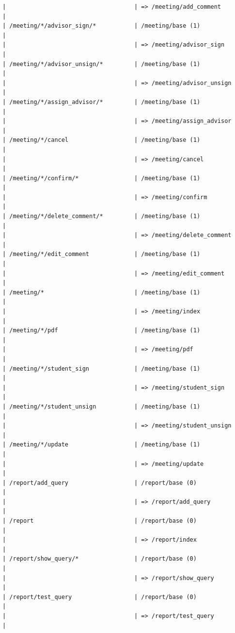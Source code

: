 \documentclass{journal}
\begin{document}
\begin{verbatim}
|                                     | => /meeting/add_comment              |
| /meeting/*/advisor_sign/*           | /meeting/base (1)                    |
|                                     | => /meeting/advisor_sign             |
| /meeting/*/advisor_unsign/*         | /meeting/base (1)                    |
|                                     | => /meeting/advisor_unsign           |
| /meeting/*/assign_advisor/*         | /meeting/base (1)                    |
|                                     | => /meeting/assign_advisor           |
| /meeting/*/cancel                   | /meeting/base (1)                    |
|                                     | => /meeting/cancel                   |
| /meeting/*/confirm/*                | /meeting/base (1)                    |
|                                     | => /meeting/confirm                  |
| /meeting/*/delete_comment/*         | /meeting/base (1)                    |
|                                     | => /meeting/delete_comment           |
| /meeting/*/edit_comment             | /meeting/base (1)                    |
|                                     | => /meeting/edit_comment             |
| /meeting/*                          | /meeting/base (1)                    |
|                                     | => /meeting/index                    |
| /meeting/*/pdf                      | /meeting/base (1)                    |
|                                     | => /meeting/pdf                      |
| /meeting/*/student_sign             | /meeting/base (1)                    |
|                                     | => /meeting/student_sign             |
| /meeting/*/student_unsign           | /meeting/base (1)                    |
|                                     | => /meeting/student_unsign           |
| /meeting/*/update                   | /meeting/base (1)                    |
|                                     | => /meeting/update                   |
| /report/add_query                   | /report/base (0)                     |
|                                     | => /report/add_query                 |
| /report                             | /report/base (0)                     |
|                                     | => /report/index                     |
| /report/show_query/*                | /report/base (0)                     |
|                                     | => /report/show_query                |
| /report/test_query                  | /report/base (0)                     |
|                                     | => /report/test_query                |

\end{verbatim}
\end{document}

